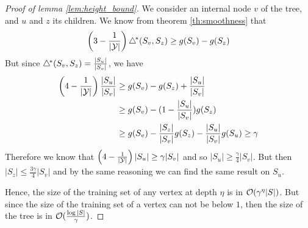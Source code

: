 \begin{proof}[Proof of lemma \ref{lem:height_bound}]
    We consider an internal node $v$ of the tree, and $u$ and $z$ its children. We know from theorem \ref{th:smoothness} that
    \begin{equation*}
        \left(3 - \frac{1}{|\mathcal{Y}|}\right) \triangle^{\!*}(S_v, S_z) \geq g(S_v) - g(S_z)
    \end{equation*}
    But since $\triangle^{\!*}(S_v, S_z) = \frac{|S_u|}{|S_v|}$, we have
    \begin{align*}
        \left(4 - \frac{1}{|\mathcal{Y}|}\right) \frac{|S_u|}{|S_v|} &\geq g(S_v) - g(S_z) + \frac{|S_u|}{|S_v|}\\
        & \geq g(S_v) - (1 - \frac{|S_u|}{|S_v|})g(S_z)\\
        & \geq g(S_v) - \frac{|S_z|}{|S_v|}g(S_z) - \frac{|S_u|}{|S_v|}g(S_u) \geq \gamma\\
    \end{align*}
    Therefore we know that $\left(4 - \frac{1}{|\mathcal{Y}|}\right)|S_u| \geq \gamma |S_v|$ and so $|S_u| \geq \frac{\gamma}{4} |S_v|$. But then $|S_z|\leq \frac{3\gamma}{4} |S_v|$ and by the same reasoning we can find the same result on $S_u$.

    Hence, the size of the training set of any vertex at depth $\eta$ is in $\mathcal{O}(\gamma^\eta |S|)$. But since the size of the training set of a vertex can not be below $1$, then the size of the tree is in $\mathcal{O}(\frac{\log |S|}{\gamma})$.
\end{proof}

